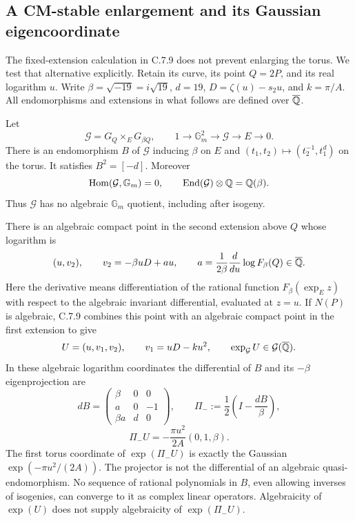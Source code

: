 \subsection{A CM-stable enlargement and its Gaussian eigencoordinate}

The fixed-extension calculation in C.7.9 does not prevent
enlarging the torus. We test that alternative explicitly.
Retain its curve, its point $Q=2P$, and its real logarithm
$u$. Write $\beta=\sqrt{-19}=i\sqrt{19}$, $d=19$,
$D=\zeta(u)-s_2u$, and $k=\pi/A$. All endomorphisms and
extensions in what follows are defined over $\overline{\mathbb Q}$.

\begin{statement}
Let
\[
 \mathcal G=G_Q\mathbin{\times_E}G_{\beta Q},\qquad
 1\longrightarrow\mathbb G_m^2\longrightarrow\mathcal G
       \longrightarrow E\longrightarrow0.
\]
There is an endomorphism $B$ of $\mathcal G$ inducing
$\beta$ on $E$ and
$(t_1,t_2)\mapsto(t_2^{-1},t_1^d)$ on the torus.
It satisfies $B^2=[-d]$. Moreover
\[
 \operatorname{Hom}(\mathcal G,\mathbb G_m)=0,
 \qquad
 \operatorname{End}(\mathcal G)\otimes\mathbb Q=\mathbb Q(\beta).
\]
Thus $\mathcal G$ has no algebraic $\mathbb G_m$ quotient,
including after isogeny.

There is an algebraic compact point in the second extension
above $Q$ whose logarithm is
\[
 (u,v_2),\qquad v_2=-\beta uD+au,
 \qquad
 a=\frac1{2\beta}
       \frac{d}{du}\log F_\beta(Q)\in\overline{\mathbb Q}.
\]
Here the derivative means differentiation of the rational
function $F_\beta(\exp_E z)$ with respect to the algebraic
invariant differential, evaluated at $z=u$.
If $N(P)$ is algebraic, C.7.9 combines this point with an
algebraic compact point in the first extension to give
\[
 U=(u,v_1,v_2),\qquad v_1=uD-ku^2,
 \qquad \exp_{\mathcal G}U\in\mathcal G(\overline{\mathbb Q}).
\]
In these algebraic logarithm coordinates the differential of
$B$ and its $-\beta$ eigenprojection are
\[
 dB=\begin{pmatrix}
 \beta&0&0\\ a&0&-1\\ \beta a&d&0
 \end{pmatrix},\qquad
 \Pi_-:=\frac12\left(I-\frac{dB}{\beta}\right),
\]
\[
 \Pi_-U=-\frac{\pi u^2}{2A}(0,1,\beta).
\]
The first torus coordinate of $\exp(\Pi_-U)$ is exactly
the Gaussian $\exp(-\pi u^2/(2A))$. The projector is not
the differential of an algebraic quasi-endomorphism. No
sequence of rational polynomials in $B$, even allowing
inverses of isogenies, can converge to it as complex linear
operators. Algebraicity of $\exp(U)$ does not supply
algebraicity of $\exp(\Pi_-U)$.
\end{statement}
